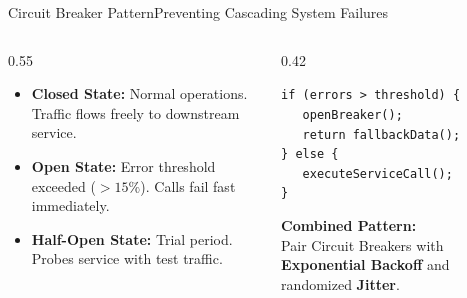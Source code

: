 \documentclass[aspectratio=169, 10pt]{beamer}
\begin{document}
\begin{frame}{Circuit Breaker Pattern}{Preventing Cascading System Failures}
  \vspace*{-0.3cm}
  \begin{columns}[T]
    \begin{column}{0.55\textwidth}
      \begin{tcolorbox}[nordiccard, title={\color{NordicDark}\faToggleOn\ \,State Machine Lifecycle}]
        \begin{itemize}
          \item \textbf{Closed State:} Normal operations. Traffic flows freely to downstream service.
          \item \textbf{Open State:} Error threshold exceeded ($>15\%$). Calls fail fast immediately.
          \item \textbf{Half-Open State:} Trial period. Probes service with test traffic.
        \end{itemize}
      \end{tcolorbox}
    \end{column}

    \begin{column}{0.42\textwidth}
      \begin{tcolorbox}[nordictealbox, title={\color{NordicTeal}\faCode\ \,Implementation Rule}]
        {\scriptsize
        \texttt{if (errors > threshold) \{\\
        \ \ \ openBreaker();\\
        \ \ \ return fallbackData();\\
        \} else \{\\
        \ \ \ executeServiceCall();\\
        \}}
        }
      \end{tcolorbox}
      
      \vspace*{0.05cm}
      \begin{tcolorbox}[nordicaccent]
        {\color{NordicBlue}\bfseries Combined Pattern:}\\[2pt]
        {\scriptsize Pair Circuit Breakers with \textbf{Exponential Backoff} and randomized \textbf{Jitter}.}
      \end{tcolorbox}
    \end{column}
  \end{columns}
\end{frame}
\end{document}
